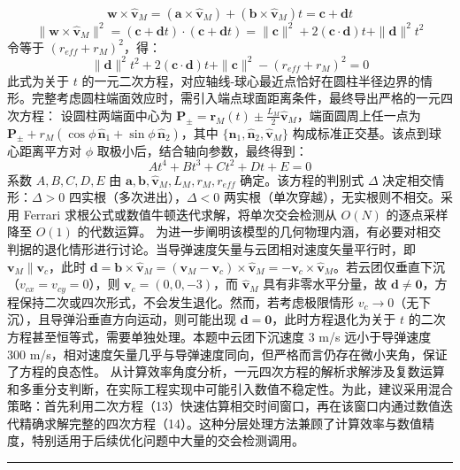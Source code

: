 \documentclass{JXUSTmodeling}
\begin{document}
\begin{equation}
\mathbf{w}\times\hat{\mathbf{v}}_M = (\mathbf{a}\times\hat{\mathbf{v}}_M)+(\mathbf{b}\times\hat{\mathbf{v}}_M)t = \mathbf{c}+\mathbf{d}t \tag{11}
\end{equation}
\begin{equation}
\|\mathbf{w}\times\hat{\mathbf{v}}_M\|^2 = (\mathbf{c}+\mathbf{d}t)\cdot(\mathbf{c}+\mathbf{d}t)=\|\mathbf{c}\|^2+2(\mathbf{c}\cdot\mathbf{d})t+\|\mathbf{d}\|^2t^2 \tag{12}
\end{equation}
令等于 $(r_{eff}+r_M)^2$，得：
\begin{equation}
\|\mathbf{d}\|^2 t^2 + 2(\mathbf{c}\cdot\mathbf{d})t + \|\mathbf{c}\|^2-(r_{eff}+r_M)^2 = 0 \tag{13}
\end{equation}
此式为关于 $t$ 的一元二次方程，对应轴线-球心最近点恰好在圆柱半径边界的情形。完整考虑圆柱端面效应时，需引入端点球面距离条件，最终导出严格的一元四次方程：
设圆柱两端面中心为 $\mathbf{P}_{\pm}=\mathbf{r}_M(t)\pm\frac{L_M}{2}\hat{\mathbf{v}}_M$，端面圆周上任一点为 $\mathbf{P}_{\pm}+r_M(\cos\phi\,\hat{\mathbf{n}}_1+\sin\phi\,\hat{\mathbf{n}}_2)$，其中 $\{\hat{\mathbf{n}}_1,\hat{\mathbf{n}}_2,\hat{\mathbf{v}}_M\}$ 构成标准正交基。该点到球心距离平方对 $\phi$ 取极小后，结合轴向参数，最终得到：
\begin{equation}
At^4+Bt^3+Ct^2+Dt+E=0 \tag{14}
\end{equation}
系数 $A,B,C,D,E$ 由 $\mathbf{a},\mathbf{b},\hat{\mathbf{v}}_M,L_M,r_M,r_{eff}$ 确定。该方程的判别式 $\Delta$ 决定相交情形：$\Delta>0$ 四实根（多次进出），$\Delta<0$ 两实根（单次穿越），无实根则不相交。采用 Ferrari 求根公式或数值牛顿迭代求解，将单次交会检测从 $O(N)$ 的逐点采样降至 $O(1)$ 的代数运算。
为进一步阐明该模型的几何物理内涵，有必要对相交判据的退化情形进行讨论。当导弹速度矢量与云团相对速度矢量平行时，即 $\mathbf{v}_M \parallel \mathbf{v}_c$，此时 $\mathbf{d}=\mathbf{b}\times\hat{\mathbf{v}}_M=(\mathbf{v}_M-\mathbf{v}_c)\times\hat{\mathbf{v}}_M=-\mathbf{v}_c\times\hat{\mathbf{v}}_M$。若云团仅垂直下沉（$v_{cx}=v_{cy}=0$），则 $\mathbf{v}_c=(0,0,-3)$，而 $\hat{\mathbf{v}}_M$ 具有非零水平分量，故 $\mathbf{d}\neq\mathbf{0}$，方程保持二次或四次形式，不会发生退化。然而，若考虑极限情形 $v_c\rightarrow 0$（无下沉），且导弹沿垂直方向运动，则可能出现 $\mathbf{d}=\mathbf{0}$，此时方程退化为关于 $t$ 的二次方程甚至恒等式，需要单独处理。本题中云团下沉速度 3 m/s 远小于导弹速度 300 m/s，相对速度矢量几乎与导弹速度同向，但严格而言仍存在微小夹角，保证了方程的良态性。
从计算效率角度分析，一元四次方程的解析求解涉及复数运算和多重分支判断，在实际工程实现中可能引入数值不稳定性。为此，建议采用混合策略：首先利用二次方程（13）快速估算相交时间窗口，再在该窗口内通过数值迭代精确求解完整的四次方程（14）。这种分层处理方法兼顾了计算效率与数值精度，特别适用于后续优化问题中大量的交会检测调用。
\noindent\rule{\textwidth}{0.4pt}
\end{document}
